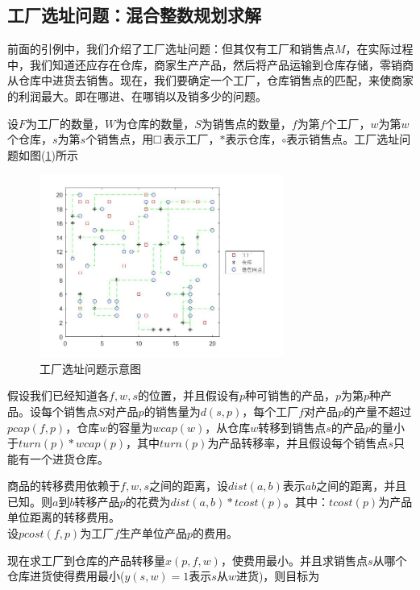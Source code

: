    \subsection{工厂选址问题：混合整数规划求解}
        \par
        前面的引例中，我们介绍了工厂选址问题：但其仅有工厂和销售点$M$，在实际过程中，我们知道还应存在仓库，商家生产产品，然后将产品运输到仓库存储，零销商从仓库中进货去销售。现在，我们要确定一个工厂，仓库销售点的匹配，来使商家的利润最大。即在哪进、在哪销以及销多少的问题。
        \par
        设$F$为工厂的数量，$W$为仓库的数量，$S$为销售点的数量，$f$为第$f$个工厂，$w$为第$w$个仓库，$s$为第$s$个销售点，用${\footnotesize \square}$表示工厂，$*$表示仓库，$\circ$表示销售点。工厂选址问题如图(\ref{fig:工厂选址问题示意图})所示
        \begin{figure}[H]
        \centering
        \includegraphics[width=8cm]{images/factory_location.jpg}
        \caption{工厂选址问题示意图}
        \label{fig:工厂选址问题示意图}
        \end{figure}
        \par
        假设我们已经知道各$f,w,s$的位置，并且假设有$p$种可销售的产品，$p$为第$p$种产品。设每个销售点$S$对产品$p$的销售量为$d(s,p)$，每个工厂$f$对产品$p$的产量不超过$pcap(f,p)$，仓库$w$的容量为$wcap(w)$，从仓库$w$转移到销售点$s$的产品$p$的量小于$turn(p)*wcap(p)$，其中$turn(p)$为产品转移率，并且假设每个销售点$s$只能有一个进货仓库。
        \par
        商品的转移费用依赖于$f,w,s$之间的距离，设$dist(a,b)$表示$ab$之间的距离，并且已知。则$a$到$b$转移产品$p$的花费为$dist(a,b)*tcost(p)$。其中：$tcost(p)$为产品单位距离的转移费用。\\
        设$pcost(f,p)$为工厂$f$生产单位产品$p$的费用。
        \par
        现在求工厂到仓库的产品转移量$x(p,f,w)$，使费用最小。并且求销售点$s$从哪个仓库进货使得费用最小($y(s,w)=1$表示$s$从$w$进货)，则目标为
